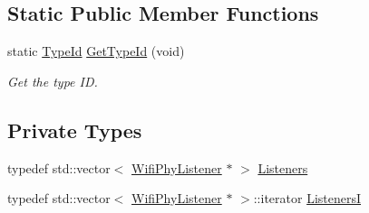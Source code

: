 \subsection*{Static Public Member Functions}
\begin{DoxyCompactItemize}
\item 
static \hyperlink{classns3_1_1TypeId}{Type\+Id} \hyperlink{classns3_1_1WifiPhyStateHelper_ac7817828f943f02aa70198d8e2f6bec7}{Get\+Type\+Id} (void)
\begin{DoxyCompactList}\small\item\em Get the type ID. \end{DoxyCompactList}\end{DoxyCompactItemize}
\subsection*{Private Types}
\begin{DoxyCompactItemize}
\item 
typedef std\+::vector$<$ \hyperlink{classns3_1_1WifiPhyListener}{Wifi\+Phy\+Listener} $\ast$ $>$ \hyperlink{classns3_1_1WifiPhyStateHelper_a76aeb492718646f940e216a63ff167f1}{Listeners}
\item 
typedef std\+::vector$<$ \hyperlink{classns3_1_1WifiPhyListener}{Wifi\+Phy\+Listener} $\ast$ $>$\+::iterator \hyperlink{classns3_1_1WifiPhyStateHelper_a19700506a92d22ccbb6c18cf7f3c0520}{ListenersI}
\end{DoxyCompactItemize}
